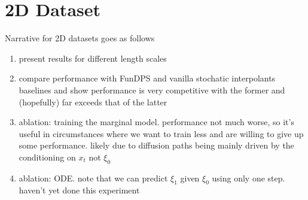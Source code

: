\section{2D Dataset}

Narrative for 2D datasets goes as follows
\begin{enumerate}
  \item present results for different length scales
  \item compare performance with FunDPS and vanilla stochatic interpolants baselines and show performance is very competitive with the former and (hopefully) far exceeds that of the latter
  \item ablation: training the marginal model. performance not much worse, so it's useful in circumstances where we want to train less and are willing to give up some performance. likely due to diffusion paths being mainly driven by the conditioning on \(x_{t}\) not \(\xi_{0}\)
  \item ablation: ODE. note that we can predict \(\xi_{1}\) given \(\xi_{0}\) using only one step. haven't yet done this experiment
\end{enumerate}